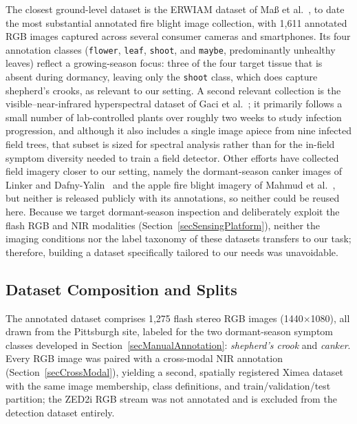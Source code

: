 The closest ground-level dataset is the ERWIAM dataset of
Ma{\ss} et al.~\cite{Mass2024ErwiamDataset}, to date the most
substantial annotated fire blight image collection, with 1{,}611
annotated RGB images captured across several consumer cameras and
smartphones.
Its four annotation classes (\texttt{flower}, \texttt{leaf},
\texttt{shoot}, and \texttt{maybe}, predominantly unhealthy
leaves) reflect a growing-season focus: three of the four target
tissue that is absent during dormancy, leaving only the
\texttt{shoot} class, which does capture shepherd's crooks, as
relevant to our setting.
A second relevant collection is the visible--near-infrared
hyperspectral dataset of Gaci
et al.~\cite{Gaci2023VisibleNIRDataset}; it primarily follows a small number
of lab-controlled plants over roughly two weeks to study infection
progression, and although it also includes a single image apiece from nine
infected field trees, that subset is sized for spectral analysis rather than
for the in-field symptom diversity needed to train a field detector.
Other efforts have collected field imagery closer to our setting,
namely the dormant-season canker images of Linker and
Dafny-Yalin~\cite{Linker2024MappingFireBlightCankersFRCNN} and the
apple fire blight imagery of Mahmud
et al.~\cite{Mahmud2023MaskRCNNFireBlight}, but neither is released
publicly with its annotations, so neither could be reused here.
Because we target dormant-season inspection and deliberately exploit
the flash RGB and NIR modalities (Section~\ref{secSensingPlatform}),
neither the imaging conditions nor the label taxonomy of these
datasets transfers to our task; therefore, building a dataset 
specifically tailored to our needs was unavoidable.

\subsection{Dataset Composition and Splits} \label{secDatasetSplits}

The annotated dataset comprises 1{,}275 flash stereo RGB images
(1440$\times$1080), all drawn from the Pittsburgh site, labeled for
the two dormant-season symptom classes developed in
Section~\ref{secManualAnnotation}: \emph{shepherd's crook} and
\emph{canker}.
Every RGB image was paired with a cross-modal NIR annotation
(Section~\ref{secCrossModal}), yielding a second, spatially registered
Ximea dataset with the same image membership, class definitions, and
train/validation/test partition; the ZED2i RGB stream was not
annotated and is excluded from the detection dataset entirely.

